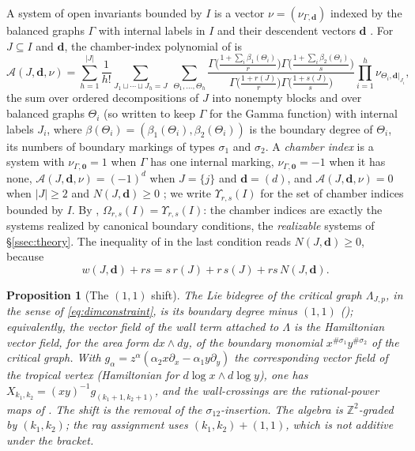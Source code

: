 \documentclass[11pt]{amsart}
\newtheorem{proposition}[theorem]{Proposition}
\theoremstyle{definition}
\theoremstyle{remark}
\newcommand{\ZZ}{\mathbb{Z}}
\newcommand{\Ascr}{\mathcal{A}}
\newcommand{\Om}{\Omega_{r,s}}
\begin{document}
A system of open invariants bounded by $I$ is a vector
$\nu=(\nu_{\Gamma,\mathbf d})$ indexed by the balanced graphs $\Gamma$ with
internal labels in $I$ and their descendent vectors $\mathbf d$
\cite[(0.3)]{GKT}.  For $J\subseteq I$ and $\mathbf d$, the chamber-index
polynomial of \cite[Notation~3.42]{GKT} is
\begin{equation}
\label{eq:Apoly}
\Ascr(J,\mathbf d,\nu)=\sum_{h=1}^{|J|}\frac1{h!}
\sum_{J_1\sqcup\cdots\sqcup J_h=J}\ \sum_{\Theta_1,\dots,\Theta_h}
\frac{\Gamma\bigl(\frac{1+\sum_i \beta_1(\Theta_i)}{r}\bigr)
      \Gamma\bigl(\frac{1+\sum_i \beta_2(\Theta_i)}{s}\bigr)}
     {\Gamma\bigl(\frac{1+r(J)}{r}\bigr)\Gamma\bigl(\frac{1+s(J)}{s}\bigr)}
\prod_{i=1}^h\nu_{\Theta_i,\mathbf d|_{J_i}},
\end{equation}
the sum over ordered decompositions of $J$ into nonempty blocks and over
balanced graphs $\Theta_i$ (so written to keep $\Gamma$ for the Gamma
function) with internal labels $J_i$, where
$\beta(\Theta_i)=(\beta_1(\Theta_i),\beta_2(\Theta_i))$ is the boundary degree of
$\Theta_i$, its numbers of boundary markings of types $\sigma_1$ and $\sigma_2$.  A
\emph{chamber index} is a system with $\nu_{\Gamma,\mathbf 0}=1$ when $\Gamma$
has one internal marking, $\nu_{\Gamma,\mathbf 0}=-1$ when it has none,
$\Ascr(J,\mathbf d,\nu)=(-1)^d$ when $J=\{j\}$ and $\mathbf d=(d)$, and
$\Ascr(J,\mathbf d,\nu)=0$ when $|J|\ge2$ and $N(J,\mathbf d)\ge0$
\cite[Definition~3.47]{GKT}; we write
$\Upsilon_{r,s}(I)$ for the set of chamber indices bounded by $I$.  By
\cite[Corollary~5.14]{GKT}, $\Om(I)=\Upsilon_{r,s}(I)$: the chamber indices are
exactly the systems realized by canonical boundary conditions, the
\emph{realizable} systems of \S\ref{ssec:theory}.
The inequality of \cite[Def.~3.47]{GKT} in the last condition reads
$N(J,\mathbf d)\ge0$, because
\[
w(J,\mathbf d)+rs=s\,r(J)+r\,s(J)+rs\,N(J,\mathbf d).
\]

\begin{proposition}[The $(1,1)$ shift]
\label{prop:shift}
The Lie bidegree of the critical graph $\Lambda_{J,p}$, in the sense of
\eqref{eq:dimconstraint}, is its boundary degree minus $(1,1)$
(\cite[Prop.~2.39]{GKT}); equivalently, the vector field of the wall term attached
to $\Lambda$ is the Hamiltonian vector field, for the area form $dx\wedge dy$, of the boundary
monomial $x^{\#\sigma_{1}}y^{\#\sigma_{2}}$ of the critical graph. With
$g_{\alpha}=z^{\alpha}(\alpha_{2}x\partial_{x}-\alpha_{1}y\partial_{y})$ the corresponding vector
field of the tropical vertex (Hamiltonian for $d\log x\wedge d\log y$), one has
$X_{k_{1},k_{2}}=(xy)^{-1}g_{(k_{1}+1,k_{2}+1)}$, and the
wall-crossings are the rational-power maps of
\cite[Lem.~4.21]{GKT}. The shift is the removal of the $\sigma_{12}$-insertion.
The algebra is $\ZZ^2$-graded by $(k_1,k_2)$; the ray assignment uses
$(k_1,k_2)+(1,1)$, which is not additive under the bracket.
\end{proposition}
\end{document}
